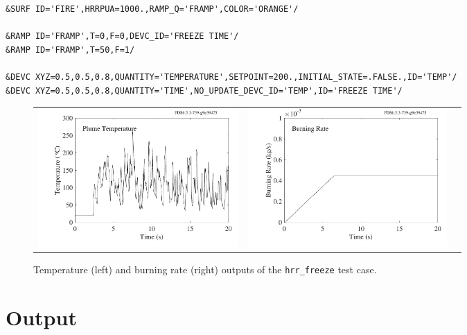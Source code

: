 \documentclass[11pt]{book}
\newcommand{\ct}{\tt\small}
\begin{document}
\footnotesize
\begin{verbatim}
&SURF ID='FIRE',HRRPUA=1000.,RAMP_Q='FRAMP',COLOR='ORANGE'/

&RAMP ID='FRAMP',T=0,F=0,DEVC_ID='FREEZE TIME'/
&RAMP ID='FRAMP',T=50,F=1/

&DEVC XYZ=0.5,0.5,0.8,QUANTITY='TEMPERATURE',SETPOINT=200.,INITIAL_STATE=.FALSE.,ID='TEMP'/
&DEVC XYZ=0.5,0.5,0.8,QUANTITY='TIME',NO_UPDATE_DEVC_ID='TEMP',ID='FREEZE TIME'/
\end{verbatim}
\normalsize

\begin{figure}[ht]
\begin{tabular*}{\textwidth}{lll}
\includegraphics[width=3.0in]{SCRIPT_FIGURES/hrr_freeze_T} &
\includegraphics[width=3.0in]{SCRIPT_FIGURES/hrr_freeze_B} &
\end{tabular*}
\caption[Example of freezing the output of a {\ct RAMP}]{Temperature (left) and burning rate (right) outputs of the {\ct hrr\_freeze} test case.}
\label{freeze_hrr}
\end{figure}




\clearpage





\chapter{Output}
\label{info:outputdata}
\end{document}
